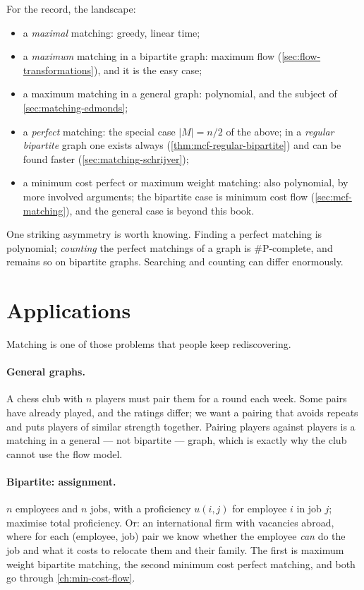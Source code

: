 For the record, the landscape:
\begin{itemize}[leftmargin=*]
  \item a \emph{maximal} matching: greedy, linear time;
  \item a \emph{maximum} matching in a bipartite graph: maximum flow
        (\cref{sec:flow-transformations}), and it is the easy case;
  \item a maximum matching in a general graph: polynomial, and the subject of
        \cref{sec:matching-edmonds};
  \item a \emph{perfect} matching: the special case $|M| = n/2$ of the above;
        in a \emph{regular bipartite} graph one exists always
        (\cref{thm:mcf-regular-bipartite}) and can be found faster
        (\cref{sec:matching-schrijver});
  \item a minimum cost perfect or maximum weight matching: also polynomial, by
        more involved arguments; the bipartite case is minimum cost flow
        (\cref{sec:mcf-matching}), and the general case is beyond this book.
\end{itemize}

One striking asymmetry is worth knowing. Finding a perfect matching is
polynomial; \emph{counting} the perfect matchings of a graph is
$\#\mathrm{P}$-complete, and remains so on bipartite graphs. Searching and
counting can differ enormously.

\section{Applications}
\label{sec:matching-applications}

Matching is one of those problems that people keep rediscovering.

\paragraph{General graphs.} A chess club with $n$ players must pair them for a
round each week. Some pairs have already played, and the ratings differ; we want
a pairing that avoids repeats and puts players of similar strength together.
Pairing players against players is a matching in a general --- not bipartite ---
graph, which is exactly why the club cannot use the flow model.

\paragraph{Bipartite: assignment.} $n$ employees and $n$ jobs, with a
proficiency $u(i,j)$ for employee $i$ in job $j$; maximise total proficiency.
Or: an international firm with vacancies abroad, where for each
(employee, job) pair we know whether the employee \emph{can} do the job and what
it costs to relocate them and their family. The first is maximum weight
bipartite matching, the second minimum cost perfect matching, and both go
through \cref{ch:min-cost-flow}.

